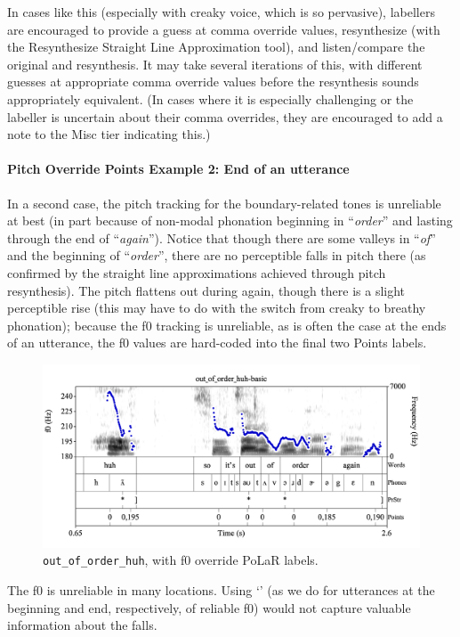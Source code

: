 \documentclass[11pt, twoside]{memoir}
\def\textlabel#1{{\relsize{-.5}\fontspec[Mapping=tex-text]{Roboto Mono}{#1}}}
\def\langtext#1{\textit{#1}}
\begin{document}
In cases like this (especially with creaky voice, which is so pervasive), labellers are encouraged to provide a guess at comma override values, resynthesize (with the Resynthesize Straight Line Approximation tool), and listen\slash compare the original and resynthesis. It may take several iterations of this, with different guesses at appropriate comma override values before the resynthesis sounds appropriately equivalent. (In cases where it is especially challenging or the labeller is uncertain about their comma overrides, they are encouraged to add a note to the Misc tier indicating this.) 
\paragraph{Pitch Override Points Example 2: End of an utterance\label{pitch-override-points-example-2}}
In a second case, the pitch tracking for the boundary-related tones is unreliable at best (in part because of non-modal phonation beginning in “\langtext{order}” and lasting through the end of “\langtext{again}”). Notice that though there are some valleys in “\langtext{of}” and the beginning of “\langtext{order}”, there are no perceptible falls in pitch there (as confirmed by the straight line approximations achieved through pitch resynthesis). The pitch flattens out during again, though there is a slight perceptible rise (this may have to do with the switch from creaky to breathy phonation); because the f0 tracking is unreliable, as is often the case at the ends of an utterance, the f0 values are hard-coded into the final two Points labels.
\begin{figure}[H]
\centering
\includegraphics[width=.875\linewidth]{Points-out_of_order_huh-basic-comma.png}
\caption{\texttt{out\_of\_order\_huh}, with f0 override PoLaR labels.
\label{fig:out_of_order_huh Points comma}
}
\end{figure}
The f0 is unreliable in many locations. Using ‘\textlabel{0}’ (as we do for utterances at the beginning and end, respectively, of reliable f0) would not capture valuable information about the falls. 
\end{document}
